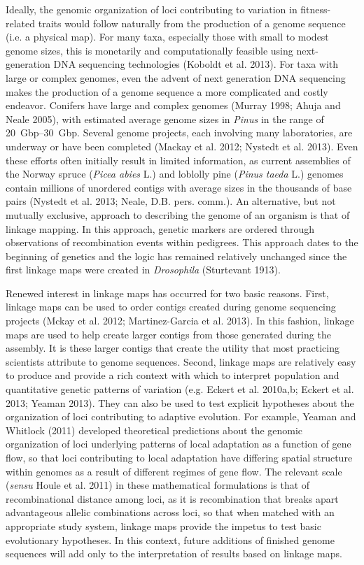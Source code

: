 \documentclass[11pt]{article}
\begin{document}
Ideally, the genomic organization of loci contributing to variation in fitness-related traits would 
follow naturally from the production of a genome sequence (i.e. a physical map). For many taxa, especially those 
with small to modest genome sizes,
this is monetarily and computationally feasible using next-generation DNA sequencing 
technologies (Koboldt et al. 2013). For taxa with large or complex
genomes, even the advent of next generation DNA sequencing makes the production of a genome sequence 
a more complicated and costly endeavor. Conifers have large and complex genomes 
(Murray 1998; Ahuja and Neale 2005), with estimated average genome sizes 
in \textit{Pinus} in the range of \SIrange{20}{30}{Gbp}. 
Several genome projects, each involving many laboratories, are
underway or have been completed (Mackay et al. 2012; Nystedt et al. 2013). Even these efforts often initially 
result in limited information, as current assemblies of the Norway spruce (\textit{Picea abies} L.) and
loblolly pine (\textit{Pinus taeda} L.) genomes contain millions of unordered contigs 
with average sizes in the thousands of base pairs (Nystedt et al. 2013; Neale, D.B. pers. comm.). An alternative, 
but not mutually exclusive, approach to describing the genome of an
organism is that of linkage mapping. In this approach, genetic markers are ordered through 
observations of recombination events within pedigrees. This approach
dates to the beginning of genetics and the logic has remained relatively unchanged since the
first linkage maps were created in \textit{Drosophila} (Sturtevant 1913).

Renewed interest in linkage maps has occurred for two basic reasons. First, linkage maps can be used 
to order contigs created during genome sequencing projects (Mckay et al. 2012; Martinez-Garcia et al. 2013). In this fashion, linkage maps are
used to help create larger contigs from those generated during the assembly. It is these larger contigs that
create the utility that most practicing scientists attribute to genome sequences. Second, linkage maps are 
relatively easy to produce and provide a rich context with which to interpret
population and quantitative genetic patterns of variation (e.g. Eckert et al. 2010a,b; Eckert et al. 2013; Yeaman 2013). 
They can also be used to test explicit hypotheses about the organization of loci contributing to 
adaptive evolution. For example, Yeaman and Whitlock (2011) developed theoretical predictions
about the genomic organization of loci underlying patterns of local adaptation as a function of gene 
flow, so that loci contributing to local adaptation have differing spatial structure within genomes
as a result of different regimes of gene flow. The relevant scale (\textit{sensu} Houle et al. 2011) in these mathematical formulations 
is that of recombinational distance among loci,
as it is recombination that breaks apart advantageous allelic combinations across loci, so that when 
matched with an appropriate study system, linkage maps provide the impetus to test basic 
evolutionary hypotheses. In this context, future additions of finished genome sequences will add only to the interpretation of results
based on linkage maps.
\end{document}
